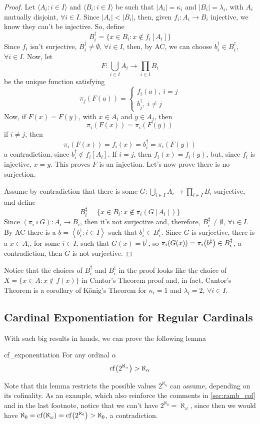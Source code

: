 \begin{proof}
    Let $\langle A_i:i\in I\rangle$ and $\langle B_i:i\in I\rangle$ be such that $|A_i|=\kappa_i$ and $|B_i|=\lambda_i$, with $A_i$ mutually disjoint, $\forall i\in I$. Since $|A_i|<|B_i|$, then, given $f_i:A_i\to B_i$ injective, we know they can't be injective. So, define
    $$B_i^\dagger=\{x\in B_i:x\notin f_i[A_i]\}$$
    Since $f_i$ isn't surjective, $B_i^\dagger\neq\emptyset$, $\forall i\in I$, then, by AC, we can choose $b_i^\dagger\in B_i^\dagger$, $\forall i\in I$. Now, let
    $$F:\bigcup_{i\in I}A_i\to\prod_{i\in I}B_i$$
    be the unique function satisfying
    $$\pi_j(F(a))=\begin{cases}
        f_i(a),~i=j\\
        b_j^\dagger,~i\neq j
    \end{cases}$$
    Now, if $F(x)=F(y)$, with $x\in A_i$ and $y\in A_j$, then
    $$\pi_i(F(x))=\pi_i(F(y))$$
    if $i\neq j$, then
    $$\pi_i(F(x))=f_i(x)=b_i^\dagger=\pi_i(F(y))$$
    a contradiction, since $b_i^\dagger\notin f_i[A_i]$. If $i=j$, then $f_i(x)=f_i(y)$, but, since $f_i$ is injective, $x=y$. This proves $F$ is an injection. Let's now prove there is no surjection.

    Assume by contradiction that there is some $G:\bigcup_{i\in I}A_i\to\prod_{i\in I}B_i$ surjective, and define
    $$B_i^\ddagger=\{x\in B_i:x\notin \pi_i(G[A_i])\}$$
    Since $(\pi_i\circ G):A_i\to B_i$, then it's not surjective and, therefore, $B_i^\ddagger\neq\emptyset$, $\forall i\in I$. By AC there is a $b=\left\langle b_i^\ddagger:i \in I\right\rangle$ such that $b_i^\ddagger\in B_i^\ddagger$. Since $G$ is surjective, there is a $x\in A_i$, for some $i\in I$, such that $G(x)=b^\ddagger$, so $\pi_i(G(x))=\pi_i{\left(b^\ddagger\right)}\in B_i^\ddagger$, a contradiction, then $G$ is not surjective.
\end{proof}

Notice that the choices of $B_i^\dagger$ and $B_i^\ddagger$ in the proof looks like the choice of $X=\{x\in A:x\notin f(x)\}$ in Cantor's Theorem proof and, in fact, Cantor's Theorem is a corollary of König's Theorem for $\kappa_i=1$ and $\lambda_i=2$, $\forall i\in I$.

\subsection{Cardinal Exponentiation for Regular Cardinals}

With such big results in hands, we can prove the following lemma
\begin{lemma}{}{cf_exponentiation}
    For any ordinal $\alpha$
    $$\mathrm{cf}\!\left(2^{\aleph_\alpha}\right)>\aleph_\alpha$$
\end{lemma}
Note that this lemma restricts the possible values $2^{\aleph_\alpha}$ can assume, depending on its cofinality. As an example, which also reinforce the comments in \cref{sec:ramb_cof} and in the last footnote, notice that we can't have $2^{\aleph_0}=\aleph_\omega$, since then we would have $\aleph_0=\mathrm{cf}\!\left(\aleph_\omega\right)=\mathrm{cf}\!\left(2^{\aleph_0}\right)>\aleph_0$, a contradiction.

